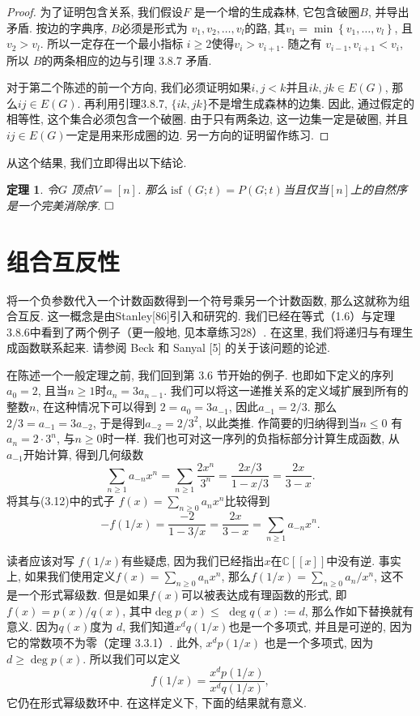 \documentclass[a4paper,12pt]{ctexbook}
\newtheorem{theorem}[lemma]{\hspace{2em}定理}%
\begin{document}
\begin{proof}
	为了证明包含关系, 我们假设$F$ 是一个增的生成森林, 它包含破圈$B$, 并导出矛盾. 按边的字典序, $B$必须是形式为 $v_{1}, v_{2}, \ldots, v_{l}$的路, 其$v_{1}=\min \left\{v_{1}, \ldots, v_{l}\right\}$, 且$v_{2}>v_{l}$. 所以一定存在一个最小指标 $i \geq 2$使得$v_{i}>v_{i+1}$. 随之有 $v_{i-1}, v_{i+1}<v_{i}$, 所以 $B$的两条相应的边与引理 3.8.7 矛盾.

	对于第二个陈述的前一个方向, 我们必须证明如果$i, j<k$并且$i k, j k \in E(G)$, 那么$i j \in E(G)$. 再利用引理3.8.7, $\{i k, j k\}$不是增生成森林的边集. 因此, 通过假定的相等性, 这个集合必须包含一个破圈. 由于只有两条边, 这一边集一定是破圈, 并且$i j \in E(G)$一定是用来形成圈的边. 另一方向的证明留作练习.
\end{proof}
从这个结果, 我们立即得出以下结论.
\begin{theorem}
	令$G$ 顶点$V=[n]$. 那么$\operatorname{isf}(G ; t)=P(G ; t)$当且仅当$[n]$上的自然序是一个完美消除序. $\hfill\square$
\end{theorem}
\section{组合互反性}

将一个负参数代入一个计数函数得到一个符号乘另一个计数函数, 那么这就称为组合互反. 这一概念是由Stanley[86]引入和研究的. 我们已经在等式（1.6）与定理3.8.6中看到了两个例子（更一般地, 见本章练习28）. 在这里, 我们将递归与有理生成函数联系起来. 请参阅 Beck 和 Sanyal [5] 的关于该问题的论述.

在陈述一个一般定理之前, 我们回到第 3.6 节开始的例子. 也即如下定义的序列$a_{0}=2$, 且当$n \geq 1$时$a_{n}=3 a_{n-1}$. 我们可以将这一递推关系的定义域扩展到所有的整数$n$, 在这种情况下可以得到 $2=a_{0}=3 a_{-1}$, 因此$a_{-1}=2 / 3$. 那么$2 / 3=a_{-1}=3 a_{-2}$, 于是得到$a_{-2}=2 / 3^{2}$, 以此类推. 作简要的归纳得到当$n \leq 0$ 有 $a_{n}=2 \cdot 3^{n}$, 与$n \geq 0$时一样. 我们也可对这一序列的负指标部分计算生成函数, 从$a_{-1}$开始计算, 得到几何级数
$$
\sum_{n \geq 1} a_{-n} x^{n}=\sum_{n \geq 1} \frac{2 x^{n}}{3^{n}}=\frac{2 x / 3}{1-x / 3}=\frac{2 x}{3-x} .
$$
将其与(3.12)中的式子 $f(x)=\sum_{n \geq 0} a_{n} x^{n}$比较得到
$$
-f(1 / x)=\frac{-2}{1-3 / x}=\frac{2 x}{3-x}=\sum_{n \geq 1} a_{-n} x^{n} .
$$

读者应该对写 $f(1 / x)$有些疑虑, 因为我们已经指出$x$在$\mathbb{C}[[x]]$中没有逆. 事实上, 如果我们使用定义$f(x)=\sum_{n \geq 0} a_{n} x^{n}$, 那么$f(1 / x)=\sum_{n \geq 0} a_{n} / x^{n}$, 这不是一个形式幂级数. 但是如果$f(x)$可以被表达成有理函数的形式, 即$f(x)=p(x) / q(x)$, 其中$\operatorname{deg} p(x) \leq$ $\operatorname{deg} q(x):=d$, 那么作如下替换就有意义. 因为$q(x)$度为 $d$, 我们知道$x^{d} q(1 / x)$也是一个多项式, 并且是可逆的, 因为它的常数项不为零（定理 3.3.1）. 此外, $x^{d} p(1 / x)$ 也是一个多项式, 因为 $d \geq \operatorname{deg} p(x)$. 所以我们可以定义
\[
f(1 / x)=\frac{x^{d} p(1 / x)}{x^{d} q(1 / x)},\tag{3.25}
\]
它仍在形式幂级数环中. 在这样定义下, 下面的结果就有意义.
\end{document}
